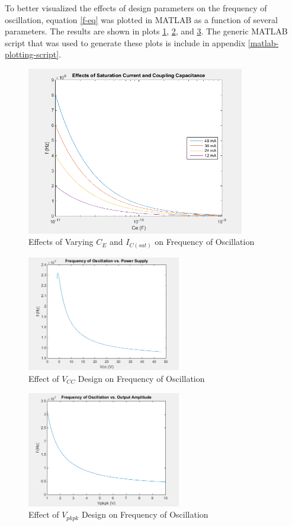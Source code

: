 \documentclass[titlepage, letterpaper, 10.5pt]{article}
\begin{document}
To better visualized the effects of design parameters on the frequency of oscillation,
equation \ref{f-eq} was plotted in MATLAB as a function of several parameters. The
results are shown in plots \ref{vary-icsat}, \ref{vary-vcc}, and \ref{vary-vpkpk}.
The generic MATLAB script that was used to generate these plots is include in appendix
\ref{matlab-plotting-script}.

\begin{figure}[ht]
	\centering
	\includegraphics[width=0.85\textwidth]{matlab/vary-ce-with-multiple-icsats}
	\caption{Effects of Varying $C_{E}$ and $I_{C(sat)}$ on Frequency of Oscillation}
	\label{vary-icsat}
\end{figure}

\begin{figure}[ht]
	\centering
	\includegraphics[width=0.6\textwidth]{matlab/vary-vcc}
	\caption{Effect of $V_{CC}$ Design on Frequency of Oscillation}
	\label{vary-vcc}
\end{figure}

\begin{figure}[ht]
	\centering
	\includegraphics[width=0.6\textwidth]{matlab/vary-vpkpk}
	\caption{Effect of $V_{pkpk}$ Design on Frequency of Oscillation}
	\label{vary-vpkpk}
\end{figure}
\end{document}
